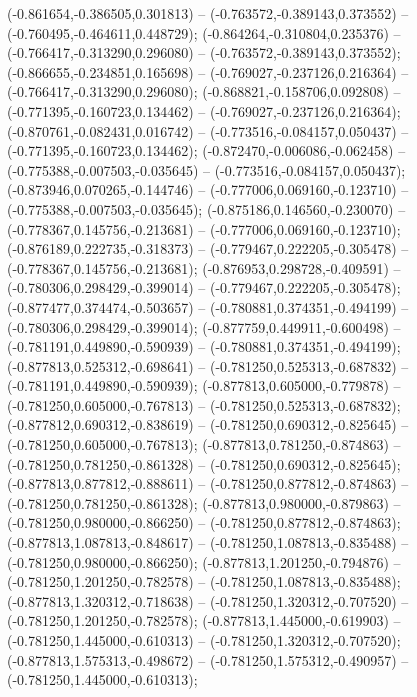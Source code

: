  (-0.861654,-0.386505,0.301813) -- (-0.763572,-0.389143,0.373552) -- (-0.760495,-0.464611,0.448729);
 (-0.864264,-0.310804,0.235376) -- (-0.766417,-0.313290,0.296080) -- (-0.763572,-0.389143,0.373552);
 (-0.866655,-0.234851,0.165698) -- (-0.769027,-0.237126,0.216364) -- (-0.766417,-0.313290,0.296080);
 (-0.868821,-0.158706,0.092808) -- (-0.771395,-0.160723,0.134462) -- (-0.769027,-0.237126,0.216364);
 (-0.870761,-0.082431,0.016742) -- (-0.773516,-0.084157,0.050437) -- (-0.771395,-0.160723,0.134462);
 (-0.872470,-0.006086,-0.062458) -- (-0.775388,-0.007503,-0.035645) -- (-0.773516,-0.084157,0.050437);
 (-0.873946,0.070265,-0.144746) -- (-0.777006,0.069160,-0.123710) -- (-0.775388,-0.007503,-0.035645);
 (-0.875186,0.146560,-0.230070) -- (-0.778367,0.145756,-0.213681) -- (-0.777006,0.069160,-0.123710);
 (-0.876189,0.222735,-0.318373) -- (-0.779467,0.222205,-0.305478) -- (-0.778367,0.145756,-0.213681);
 (-0.876953,0.298728,-0.409591) -- (-0.780306,0.298429,-0.399014) -- (-0.779467,0.222205,-0.305478);
 (-0.877477,0.374474,-0.503657) -- (-0.780881,0.374351,-0.494199) -- (-0.780306,0.298429,-0.399014);
 (-0.877759,0.449911,-0.600498) -- (-0.781191,0.449890,-0.590939) -- (-0.780881,0.374351,-0.494199);
 (-0.877813,0.525312,-0.698641) -- (-0.781250,0.525313,-0.687832) -- (-0.781191,0.449890,-0.590939);
 (-0.877813,0.605000,-0.779878) -- (-0.781250,0.605000,-0.767813) -- (-0.781250,0.525313,-0.687832);
 (-0.877812,0.690312,-0.838619) -- (-0.781250,0.690312,-0.825645) -- (-0.781250,0.605000,-0.767813);
 (-0.877813,0.781250,-0.874863) -- (-0.781250,0.781250,-0.861328) -- (-0.781250,0.690312,-0.825645);
 (-0.877813,0.877812,-0.888611) -- (-0.781250,0.877812,-0.874863) -- (-0.781250,0.781250,-0.861328);
 (-0.877813,0.980000,-0.879863) -- (-0.781250,0.980000,-0.866250) -- (-0.781250,0.877812,-0.874863);
 (-0.877813,1.087813,-0.848617) -- (-0.781250,1.087813,-0.835488) -- (-0.781250,0.980000,-0.866250);
 (-0.877813,1.201250,-0.794876) -- (-0.781250,1.201250,-0.782578) -- (-0.781250,1.087813,-0.835488);
 (-0.877813,1.320312,-0.718638) -- (-0.781250,1.320312,-0.707520) -- (-0.781250,1.201250,-0.782578);
 (-0.877813,1.445000,-0.619903) -- (-0.781250,1.445000,-0.610313) -- (-0.781250,1.320312,-0.707520);
 (-0.877813,1.575313,-0.498672) -- (-0.781250,1.575312,-0.490957) -- (-0.781250,1.445000,-0.610313);
